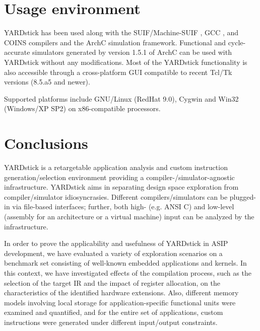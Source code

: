 \documentclass{comjnl}
\begin{document}
\section{Usage environment}
\label{Sec:Usage}
YARDstick has been used along with the SUIF/Machine-SUIF \cite{MachSUIF}, GCC \cite{GCC}, and COINS \cite{COINS} compilers and the ArchC \cite{ArchC} simulation framework. Functional and cycle-accurate simulators generated by version 1.5.1 of ArchC can be used with YARDstick without any modifications. Most of the YARDstick functionality is also accessible through a cross-platform GUI \cite{Kavvadias07} compatible to recent Tcl/Tk versions (8.5.a5 and newer). 

Supported platforms include GNU/Linux (RedHat 9.0), Cygwin and Win32 (Windows/XP SP2) on x86-compatible processors.

\section{Conclusions}
\label{Sec:Conclusions}
YARDstick is a retargetable application analysis and custom instruction generation/selection environment providing a compiler-/simulator-agnostic infrastructure. YARDstick aims in separating design space exploration from compiler/simulator idiosyncrasies. Different compilers/simulators can be plugged-in via file-based interfaces; further, both high- (e.g. ANSI C) and low-level (assembly for an architecture or a virtual machine) input can be analyzed by the infrastructure.

In order to prove the applicability and usefulness of YARDstick in ASIP development, we have evaluated a variety of exploration scenarios on a benchmark set consisting of well-known embedded applications and kernels. In this context, we have investigated effects of the compilation process, such as the selection of the target IR and the impact of register allocation, on the characteristics of the identified hardware extensions. Also, different memory models involving local storage for application-specific functional units were examined and quantified, and for the entire set of applications, custom instructions were generated under different input/output constraints.






\nocite{*}



\end{document}
